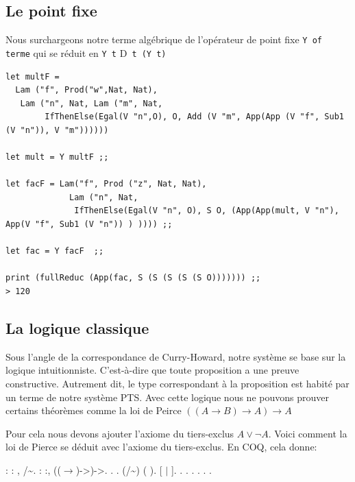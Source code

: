 \documentclass[11pt]{book}
\newcommand{\imp}{{\letterimp D}\hspace{0.1cm}}
\begin{document}
\subsection{Le point fixe}
Nous surchargeons notre terme algébrique de l'opérateur de point fixe \verb+Y of terme+ qui
se réduit en \verb+Y t+ \imp\ \verb+t (Y t)+
\begin{Verbatim}
let multF = 
  Lam ("f", Prod("w",Nat, Nat),
   Lam ("n", Nat, Lam ("m", Nat, 
        IfThenElse(Egal(V "n",O), O, Add (V "m", App(App (V "f", Sub1 (V "n")), V "m"))))))

let mult = Y multF ;;

let facF = Lam("f", Prod ("z", Nat, Nat), 
             Lam ("n", Nat,
              IfThenElse(Egal(V "n", O), S O, (App(App(mult, V "n"), App(V "f", Sub1 (V "n")) ) )))) ;;

let fac = Y facF  ;;

print (fullReduc (App(fac, S (S (S (S (S O))))))) ;;
> 120
\end{Verbatim}

\subsection{La logique classique}
Sous l'angle de la correspondance de Curry-Howard, notre système se base sur la logique intuitionniste.
C'est-à-dire que toute proposition a une preuve constructive.
 Autrement dit, le type correspondant à la proposition est habité par un terme de notre système PTS.
Avec cette logique nous ne pouvons prouver certains théorèmes comme la loi de Peirce $((A\rightarrow B)\rightarrow A)\rightarrow A$

Pour cela nous devons ajouter l'axiome du tiers-exclus $A \vee \neg A$. 
Voici comment la loi de Pierce se déduit avec l'axiome du tiers-exclus. En COQ, cela donne:

\begin{coqdoccode}
\coqdocnoindent
{} : \coqdockw{\ensuremath{\forall}} : , /\~{}.\coqdoceol
\coqdocnoindent
{}  : \coqdockw{\ensuremath{\forall}}  :, ((\ensuremath{\rightarrow})->)->.\coqdoceol
\coqdocnoindent
{}.\coqdoceol
\coqdocindent{1.00em}
.\coqdoceol
\coqdocindent{1.00em}
 (/\~{})  (  ).\coqdoceol
\coqdocindent{1.00em}
   [ \ensuremath{|} ].\coqdoceol
\coqdocindent{1.00em}
 .\coqdoceol
\coqdocindent{1.00em}
  .\coqdoceol
\coqdocindent{1.00em}
.\coqdoceol
\coqdocindent{1.00em}
.\coqdoceol
\coqdocnoindent
{}.\coqdoceol
\coqdocemptyline
\coqdocnoindent
{} .\coqdoceol
\end{coqdoccode}
\end{document}
